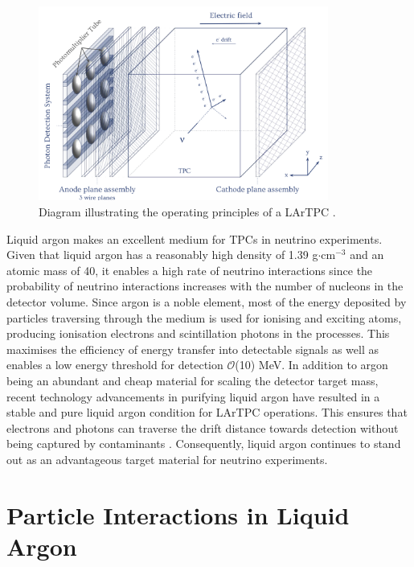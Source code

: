 \begin{figure}[ht!] 
\centering    
\includegraphics[width=0.85\textwidth]{LARTPC}
\caption[Liquid Argon Time Projection Chamber Diagram]{
Diagram illustrating the operating principles of a LArTPC \cite{RhiannonPhD}.
}
\label{fig:LARTPC}
\end{figure}

\newpage
Liquid argon makes an excellent medium for TPCs in neutrino experiments.
Given that liquid argon has a reasonably high density of 1.39 g$\cdot$cm$^{-3}$ and an atomic mass of 40, it enables a high rate of neutrino interactions since the probability of neutrino interactions increases with the number of nucleons in the detector volume.
Since argon is a noble element, most of the energy deposited by particles traversing through the medium is used for ionising and exciting atoms, producing ionisation electrons and scintillation photons in the processes.
This maximises the efficiency of energy transfer into detectable signals as well as enables a low energy threshold for detection $\mathcal{O}$(10) MeV.
In addition to argon being an abundant and cheap material for scaling the detector target mass, recent technology advancements in purifying liquid argon have resulted in a stable and pure liquid argon condition for LArTPC operations.
This ensures that electrons and photons can traverse the drift distance towards detection without being captured by contaminants \cite{ubooneEtime}.
Consequently, liquid argon continues to stand out as an advantageous target material for neutrino experiments. 


\section{Particle Interactions in Liquid Argon}
\label{sec3:creation}


